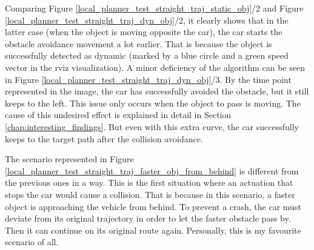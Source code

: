 Comparing Figure \ref{local_planner_test_straight_traj_static_obj}/2 and Figure \ref{local_planner_test_straight_traj_dyn_obj}/2, it clearly shows that in the latter case (when the object is moving opposite the car), the car starts the obstacle avoidance movement a lot earlier. That is because the object is successfully detected as dynamic (marked by a blue circle and a green speed vector in the rviz visualization). A minor deficiency of the algorithm can be seen in Figure \ref{local_planner_test_straight_traj_dyn_obj}/3. By the time point represented in the image, the car has successfully avoided the obstacle, but it still keeps to the left. This issue only occurs when the object to pass is moving. The cause of this undesired effect is explained in detail in Section \ref{chap:interesting_findings}. But even with this extra curve, the car successfully keeps to the target path after the collision avoidance.

The scenario represented in Figure \ref{local_planner_test_straight_traj_faster_obj_from_behind} is different from the previous ones in a way. This is the first situation where an actuation that stops the car would cause a collision. That is because in this scenario, a faster object is approaching the vehicle from behind. To prevent a crash, the car must deviate from its original trajectory in order to let the faster obstacle pass by. Then it can continue on its original route again. Personally, this is my favourite scenario of all.

